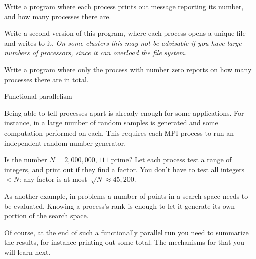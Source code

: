 \begin{exercise}
  \label{ex:hello3}
  Write a program where each process prints out message
  reporting its number, and how many processes there are.

  Write a second version of this program, where each process opens a
  unique file and writes to it. \emph{On some clusters this may not be
    advisable if you have large numbers of processors, since it can
    overload the file system.}
\end{exercise}

\begin{exercise}
  \label{ex:hello4}
  Write a program where only the process with number zero
  reports on how many processes there are in total.
\end{exercise}

 {Functional parallelism}

Being able to tell processes apart is already enough for some applications.
For instance, in  a large number of random samples
is generated and some computation performed on each. This requires each MPI
process to run an independent random number generator.

\begin{exercise}
  \label{ex:primetest}
  Is the number $N=2,000,000,111$ prime?  Let each process test a
  range of integers, and print out if they find a factor.  You don't
  have to test all integers~$<N$: any factor is at most~$\sqrt
  N\approx 45,200$.
\end{exercise}
As another example, in  problems
a number of points in a search space needs to be evaluated. Knowing
a process's rank is enough to let it generate its own portion of the search space.

Of course, at the end of such a functionally parallel run you need to
summarize the results, for instance printing out some total.
The mechanisms for that you will learn next.

%

